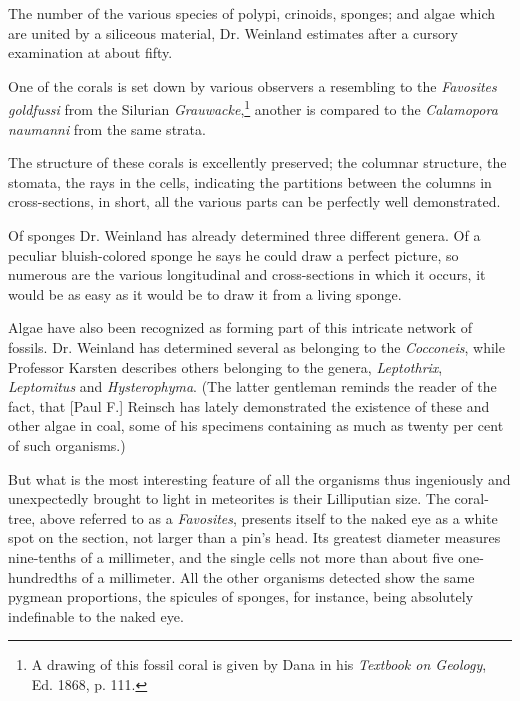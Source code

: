 \documentclass[a4paper, 12pt, oneside]{article}
\begin{document}
The number of the various species of polypi, crinoids, sponges; and algae which are united by a siliceous material, Dr. Weinland estimates after a cursory examination at about fifty.

One of the corals is set down by various observers a resembling to the \emph{Favosites goldfussi} from the Silurian \emph{Grauwacke},\footnote{A drawing of this fossil coral is given by Dana in his \emph{Textbook on Geology}, Ed. 1868, p. 111.} another is compared to the \emph{Calamopora naumanni} from the same strata.

The structure of these corals is excellently preserved; the columnar structure, the stomata, the rays in the cells, indicating the partitions between the columns in cross-sections, in short, all the various parts can be perfectly well demonstrated.

Of sponges Dr. Weinland has already determined three different genera. Of a peculiar bluish-colored sponge he says he could draw a perfect picture, so numerous are the various longitudinal and cross-sections in which it occurs, it would be as easy as it would be to draw it from a living sponge.

Algae have also been recognized as forming part of this intricate network of fossils. Dr. Weinland has determined several as belonging to the \emph{Cocconeis}, while Professor Karsten describes others belonging to the genera, \emph{Leptothrix}, \emph{Leptomitus} and \emph{Hysterophyma}. (The latter gentleman reminds the reader of the fact, that [Paul F.] Reinsch has lately demonstrated the existence of these and other algae in coal, some of his specimens containing as much as twenty per cent of such organisms.)

But what is the most interesting feature of all the organisms thus ingeniously and unexpectedly brought to light in meteorites is their Lilliputian size. The coral-tree, above referred to as a \emph{Favosites}, presents itself to the naked eye as a white spot on the section, not larger than a pin's head. Its greatest diameter measures nine-tenths of a millimeter, and the single cells not more than about five one-hundredths of a millimeter. All the other organisms detected show the same pygmean proportions, the spicules of sponges, for instance, being absolutely indefinable to the naked eye.
\end{document}
